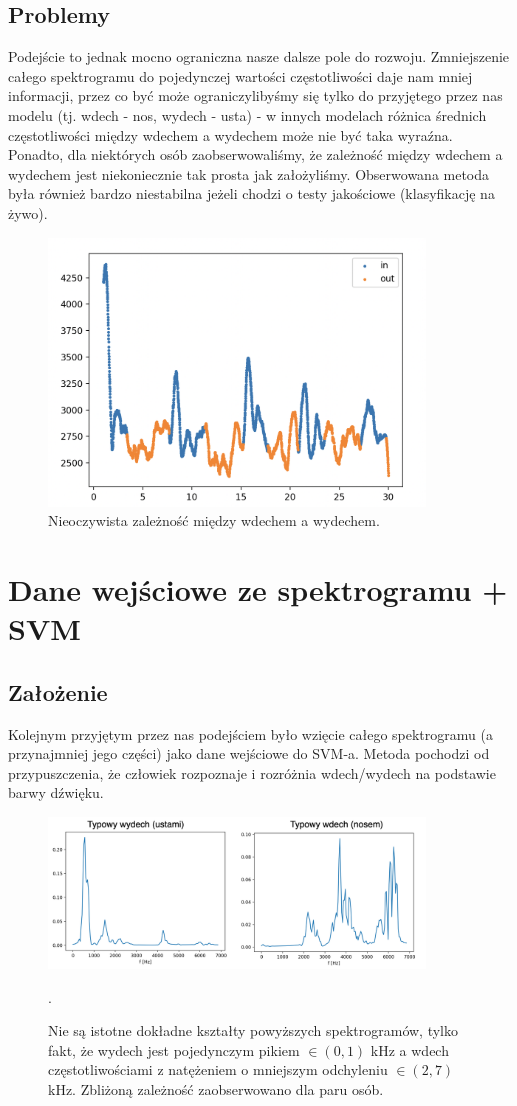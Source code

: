 \documentclass[polish]{article}
\begin{document}
\subsection{Problemy}
Podejście to jednak mocno ograniczna nasze dalsze pole do rozwoju.  Zmniejszenie całego 
spektrogramu do pojedynczej wartości częstotliwości daje nam mniej informacji, przez co 
być może ograniczylibyśmy się tylko do przyjętego przez nas modelu (tj.  wdech - nos, wydech - usta) - w innych
modelach różnica średnich częstotliwości między wdechem a wydechem może nie być taka wyraźna.  Ponadto, dla niektórych osób zaobserwowaliśmy, 
że zależność między wdechem a wydechem jest niekoniecznie tak prosta jak założyliśmy. Obserwowana metoda
była również bardzo niestabilna jeżeli chodzi o testy jakościowe (klasyfikację na żywo).
\begin{figure}[H]
	\centering
	\includegraphics[width=10cm]{problem_srednie}
	\caption{Nieoczywista zależność między wdechem a wydechem.}
\end{figure}

\section{Dane wejściowe ze spektrogramu + SVM}
\subsection{Założenie}
Kolejnym przyjętym przez nas podejściem było wzięcie całego spektrogramu (a przynajmniej jego części) jako dane wejściowe do SVM-a.  
Metoda pochodzi od przypuszczenia, że człowiek rozpoznaje i rozróżnia wdech/wydech
na podstawie barwy dźwięku.  
\begin{figure}[H]
	\centering
	\includegraphics[width=10cm]{wdech_wydech_spektro}
  	\caption{Nie są istotne dokładne kształty powyższych spektrogramów, tylko fakt, że wydech
jest pojedynczym pikiem $\in (0, 1)$ kHz a wdech częstotliwościami z natężeniem
o mniejszym odchyleniu $\in (2, 7)$ kHz.  Zbliżoną zależność zaobserwowano dla paru osób.}.
\end{figure}
\end{document}
